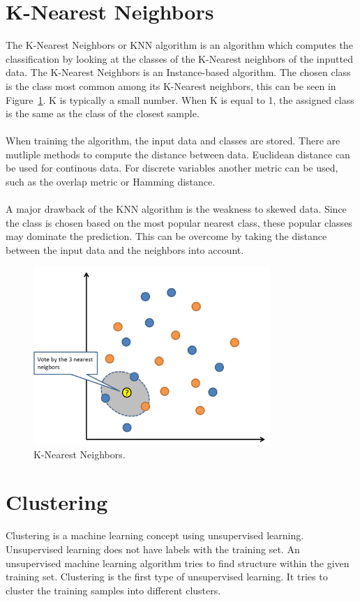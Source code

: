 \section{K-Nearest Neighbors}
The K-Nearest Neighbors or KNN algorithm is an algorithm which computes the classification by looking at the classes of the K-Nearest neighbors of the inputted data. The K-Nearest Neighbors is an Instance-based algorithm. \cite{mlcat} The chosen class is the class most common among its K-Nearest neighbors, this can be seen in Figure~\ref{fig:knn}. K is typically a small number. When K is equal to 1, the assigned class is the same as the class of the closest sample. \\\\
When training the algorithm, the input data and classes are stored. There are mutliple methods to compute the distance between data. Euclidean distance can be used for continous data. For discrete variables another metric can be used, such as the overlap metric or Hamming distance.\\\\
A major drawback of the KNN algorithm is the weakness to skewed data. Since the class is chosen based on the most popular nearest class, these popular classes may dominate the prediction. This can be overcome by taking the distance between the input data and the neighbors into account.
\begin{figure}[H]
\centering
\includegraphics[width=0.8\textwidth]{Figures/knn}
\decoRule
\caption[K-Nearest Neighbors]{K-Nearest Neighbors. \cite{knn}}
\label{fig:knn}
\end{figure}

\section{Clustering}
Clustering is a machine learning concept using unsupervised learning. Unsupervised learning does not have labels with the training set. An unsupervised machine learning algorithm tries to find structure within the given training set. Clustering is the first type of unsupervised learning. It tries to cluster the training samples into different clusters.

